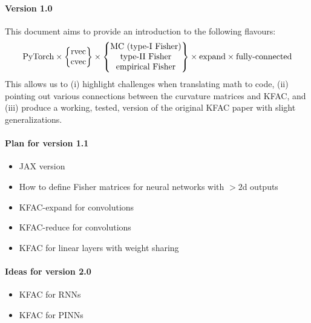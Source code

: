 \paragraph{Version 1.0} This document aims to provide an introduction to the following flavours:
\begin{align*}
  \text{PyTorch}
  \times
  \begin{Bmatrix}
    \operatorname{rvec}
    \\
    \operatorname{cvec}
  \end{Bmatrix}
  \times
  \begin{Bmatrix}
    \text{MC (type-I Fisher)}
    \\
    \text{type-II Fisher}
    \\
    \text{empirical Fisher}
  \end{Bmatrix}
  \times
  \text{expand}
  \times
  \text{fully-connected}
\end{align*}
This allows us to (i) highlight challenges when translating math to code, (ii) pointing out various connections between the curvature matrices and KFAC, and (iii) produce a working, tested, version of the original KFAC paper with slight generalizations.

\paragraph{Plan for version 1.1}
\begin{itemize}
\item JAX version
\item How to define Fisher matrices for neural networks with $>2$d outputs
\item KFAC-expand for convolutions \cite{grosse2016kroneckerfactored}
\item KFAC-reduce for convolutions \cite{eschenhagen2023kroneckerfactored}
\item KFAC for linear layers with weight sharing \cite{eschenhagen2023kroneckerfactored}
\end{itemize}

\paragraph{Ideas for version 2.0}
\begin{itemize}
  \item KFAC for RNNs \cite{martens2018kroneckerfactored}
    \item KFAC for PINNs \cite{dangel2024kroneckerfactored}
\end{itemize}
